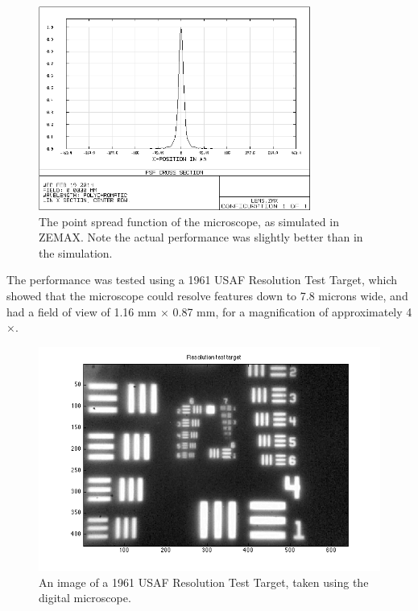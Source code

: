 \begin{figure}[h!]
\centering
\includegraphics[width=0.8\textwidth]{Images/Microscope/microscope_psf.png}
\caption{The point spread function of the microscope, as simulated in ZEMAX. Note the actual performance was slightly better than in the simulation.}
\end{figure}

The performance was tested using a 1961 USAF Resolution Test Target, which showed that the microscope could resolve features down to 7.8 microns wide, and had a field of view of 1.16 mm $\times$ 0.87 mm, for a magnification of approximately 4$\times$.

\begin{figure}[h!]

\centering
\includegraphics[width=1.0\textwidth]{Images/Microscope/target.png}
\caption{An image of a 1961 USAF Resolution Test Target, taken using the digital microscope. \label{fig:usaf}}
\end{figure}

